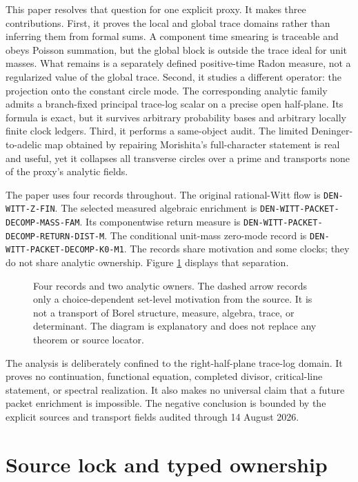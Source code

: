 \documentclass[11pt,a4paper]{article}
\theoremstyle{definition}
\begin{document}
This paper resolves that question for one explicit proxy.  It makes three
contributions.  First, it proves the local and global trace domains rather
than inferring them from formal sums.  A component time smearing is traceable
and obeys Poisson summation, but the global block is outside the trace ideal
for unit masses.  What remains is a separately defined positive-time Radon
measure, not a regularized value of the global trace.  Second, it studies a
different operator: the projection onto the constant circle mode.  The
corresponding analytic family admits a branch-fixed principal trace-log scalar
on a precise open half-plane.  Its formula is exact, but it survives arbitrary
probability bases and arbitrary locally finite clock ledgers.  Third, it
performs a same-object audit.  The limited Deninger-to-adelic map obtained by
repairing Morishita's full-character statement is real and useful, yet it
collapses all transverse circles over a prime and transports none of the
proxy's analytic fields.

The paper uses four records throughout.  The original rational-Witt flow is
\texttt{DEN-WITT-Z-FIN}.  The selected measured algebraic enrichment is
\texttt{DEN-WITT-PACKET-DECOMP-MASS-FAM}.  Its componentwise return measure is
\texttt{DEN-WITT-PACKET-DECOMP-RETURN-DIST-M}.  The conditional unit-mass
zero-mode record is \texttt{DEN-WITT-PACKET-DECOMP-K0-M1}.  The records share
motivation and some clocks; they do not share analytic ownership.  Figure
\ref{fig:owners} displays that separation.

\begin{figure}[htbp]
  \centering
  \resizebox{0.97\textwidth}{!}{}
  \caption{Four records and two analytic owners.  The dashed arrow records
  only a choice-dependent set-level motivation from the source.  It is not a
  transport of Borel structure, measure, algebra, trace, or determinant.  The
  diagram is explanatory and does not replace any theorem or source locator.}
  \label{fig:owners}
\end{figure}

The analysis is deliberately confined to the right-half-plane trace-log
domain.  It proves no continuation, functional equation, completed divisor,
critical-line statement, or spectral realization.  It also makes no universal
claim that a future packet enrichment is impossible.  The negative conclusion
is bounded by the explicit sources and transport fields audited through
14 August 2026.

\section{Source lock and typed ownership}
\label{sec:source-lock}
\end{document}
